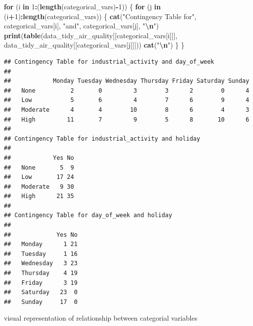 \documentclass[
]{article}
\newenvironment{Shaded}{\begin{snugshade}}{\end{snugshade}}
\newcommand{\ControlFlowTok}[1]{\textcolor[rgb]{0.13,0.29,0.53}{\textbf{#1}}}
\newcommand{\DecValTok}[1]{\textcolor[rgb]{0.00,0.00,0.81}{#1}}
\newcommand{\FunctionTok}[1]{\textcolor[rgb]{0.13,0.29,0.53}{\textbf{#1}}}
\newcommand{\NormalTok}[1]{#1}
\newcommand{\SpecialCharTok}[1]{\textcolor[rgb]{0.81,0.36,0.00}{\textbf{#1}}}
\newcommand{\StringTok}[1]{\textcolor[rgb]{0.31,0.60,0.02}{#1}}
\begin{document}
\begin{Shaded}
\begin{Highlighting}[]
\ControlFlowTok{for}\NormalTok{ (i }\ControlFlowTok{in} \DecValTok{1}\SpecialCharTok{:}\NormalTok{(}\FunctionTok{length}\NormalTok{(categorical\_vars)}\SpecialCharTok{{-}}\DecValTok{1}\NormalTok{)) \{}
  \ControlFlowTok{for}\NormalTok{ (j }\ControlFlowTok{in}\NormalTok{ (i}\SpecialCharTok{+}\DecValTok{1}\NormalTok{)}\SpecialCharTok{:}\FunctionTok{length}\NormalTok{(categorical\_vars)) \{}
    \FunctionTok{cat}\NormalTok{(}\StringTok{"Contingency Table for"}\NormalTok{, categorical\_vars[i], }\StringTok{"and"}\NormalTok{, categorical\_vars[j], }\StringTok{"}\SpecialCharTok{\textbackslash{}n}\StringTok{"}\NormalTok{)}
    \FunctionTok{print}\NormalTok{(}\FunctionTok{table}\NormalTok{(data\_tidy\_air\_quality[[categorical\_vars[i]]], data\_tidy\_air\_quality[[categorical\_vars[j]]]))}
    \FunctionTok{cat}\NormalTok{(}\StringTok{"}\SpecialCharTok{\textbackslash{}n}\StringTok{"}\NormalTok{)}
\NormalTok{  \}}
\NormalTok{\}}
\end{Highlighting}
\end{Shaded}

\begin{verbatim}
## Contingency Table for industrial_activity and day_of_week 
##           
##            Monday Tuesday Wednesday Thursday Friday Saturday Sunday
##   None          2       0         3        3      2        0      4
##   Low           5       6         4        7      6        9      4
##   Moderate      4       4        10        8      6        4      3
##   High         11       7         9        5      8       10      6
## 
## Contingency Table for industrial_activity and holiday 
##           
##            Yes No
##   None       5  9
##   Low       17 24
##   Moderate   9 30
##   High      21 35
## 
## Contingency Table for day_of_week and holiday 
##            
##             Yes No
##   Monday      1 21
##   Tuesday     1 16
##   Wednesday   3 23
##   Thursday    4 19
##   Friday      3 19
##   Saturday   23  0
##   Sunday     17  0
\end{verbatim}

visual representation of relationship between categorial variables
\end{document}
